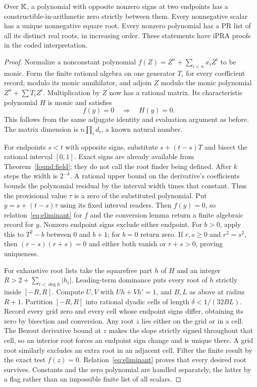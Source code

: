 \begin{theorem}
\label{found:roots}
Over $\mathbb K$, a polynomial with opposite nonzero signs at two endpoints
has a constructible-in-arithmetic zero strictly between them. Every
nonnegative scalar has a unique nonnegative square root. Every
nonzero polynomial has a PR list of all its distinct real roots,
in increasing order. These statements have iPRA proofs in the coded
interpretation.
\end{theorem}
\begin{proof}
Normalize a nonconstant polynomial
$f(Z)=Z^n+\sum_{i<n}x_iZ^i$ to be monic. Form the finite rational
algebra on one generator $T_i$ for every coefficient record, modulo its
monic annihilator, and adjoin $Z$ modulo the monic polynomial
$Z^n+\sum T_iZ^i$. Multiplication by $Z$ now has a rational matrix.
Its characteristic polynomial $H$ is monic and satisfies
\begin{equation}\label{eq:eliminant}
 f(y)=0\quad\Longrightarrow\quad H(y)=0.
\end{equation}
This follows from the same adjugate identity and evaluation argument as
before. The matrix dimension is $n\prod_i d_i$, a known natural number.

For endpoints $s<t$ with opposite signs, substitute $s+(t-s)T$ and
bisect the rational interval $[0,1]$. Exact signs are already available
from Theorem~\ref{found:field}; they do not call the root finder being
defined. After $k$ steps the width is $2^{-k}$. A rational upper bound
on the derivative's coefficients bounds the polynomial residual by
the interval width times that constant. Thus the provisional value $\tau$
is a zero of the substituted polynomial. Put $y=s+(t-s)\tau$ using its
fixed interval readers. Then $f(y)=0$, so
relation~\eqref{eq:eliminant} for $f$ and the conversion lemma return
a finite algebraic record for $y$. Nonzero endpoint signs exclude either endpoint.
For $b>0$, apply this to $T^2-b$ between $0$ and $b+1$; for $b=0$
return zero. If $r,s\ge0$ and $r^2=s^2$, then
$(r-s)(r+s)=0$ and either both vanish or $r+s>0$, proving uniqueness.

For exhaustive root lists take the squarefree part $h$ of $H$ and
an integer $R>2+\sum_{i<\deg h}|h_i|$. Leading-term dominance puts
every root of $h$ strictly inside $[-R,R]$. Compute $U,V$ with
$Uh+Vh'=1$, and $B,L$ as above at radius $R+1$. Partition $[-R,R]$
into rational dyadic cells of length $\delta<1/(32BL)$. Record every
grid zero and every cell whose endpoint signs differ, obtaining its
zero by bisection and conversion. Any root $z$ lies either on the grid
or in a cell. The Bezout derivative bound at $z$ makes the slope
strictly signed throughout that cell, so an interior root forces an
endpoint sign change and is unique there. A grid root similarly excludes
an extra root in an adjacent cell. Filter the finite result by the exact
test $f(z)=0$. Relation~\eqref{eq:eliminant} proves that every desired
root survives. Constants and the zero polynomial are handled separately,
the latter by a flag rather than an impossible finite list of all scalars.


\end{proof}
